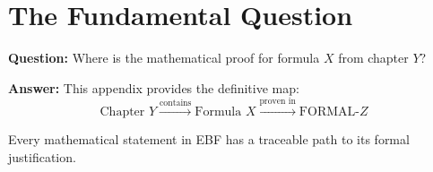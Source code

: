 \section{The Fundamental Question}
\label{sec:fm-fundamental}

\begin{tcolorbox}[colback=red!5!white, colframe=red!75!black,
    title=\textbf{The Fundamental Question}]

\textbf{Question:} Where is the mathematical proof for formula $X$ from chapter $Y$?

\textbf{Answer:} This appendix provides the definitive map:
\begin{equation}
\text{Chapter } Y \xrightarrow{\text{contains}} \text{Formula } X \xrightarrow{\text{proven in}} \text{FORMAL-}Z
\end{equation}

Every mathematical statement in EBF has a traceable path to its formal justification.

\end{tcolorbox}

